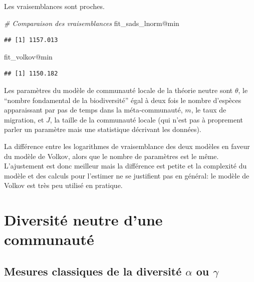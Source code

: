 \documentclass[
  11pt,
  american,
  a4paper,
  extrafontsizes,onecolumn,openright
  ]{memoir}
\newenvironment{Shaded}{\begin{snugshade}}{\end{snugshade}}
\newcommand{\CommentTok}[1]{\textcolor[rgb]{0.56,0.35,0.01}{\textit{#1}}}
\newcommand{\NormalTok}[1]{#1}
\newcommand{\SpecialCharTok}[1]{\textcolor[rgb]{0.00,0.00,0.00}{#1}}
\begin{document}
\normalsize

Les vraisemblances sont proches.

\scriptsize

\begin{Shaded}
\begin{Highlighting}[]
\CommentTok{\# Comparaison des vraisemblances}
\NormalTok{fit\_sads\_lnorm}\SpecialCharTok{@}\NormalTok{min}
\end{Highlighting}
\end{Shaded}

\begin{verbatim}
## [1] 1157.013
\end{verbatim}

\begin{Shaded}
\begin{Highlighting}[]
\NormalTok{fit\_volkov}\SpecialCharTok{@}\NormalTok{min}
\end{Highlighting}
\end{Shaded}

\begin{verbatim}
## [1] 1150.182
\end{verbatim}

\normalsize

Les paramètres du modèle de communauté locale de la théorie neutre sont \(\theta\), le \enquote{nombre fondamental de la biodiversité} égal à deux fois le nombre d'espèces apparaissant par pas de temps dans la méta-communauté, \(m\), le taux de migration, et \(J\), la taille de la communauté locale (qui n'est pas à proprement parler un paramètre mais une statistique décrivant les données).

La différence entre les logarithmes de vraisemblance des deux modèles en faveur du modèle de Volkov, alors que le nombre de paramètres est le même.
L'ajustement est donc meilleur mais la différence est petite et la complexité du modèle et des calculs pour l'estimer ne se justifient pas en général: le modèle de Volkov est très peu utilisé en pratique.

\hypertarget{part-diversituxe9-neutre-dune-communautuxe9}{%
\part{Diversité neutre d'une communauté}\label{part-diversituxe9-neutre-dune-communautuxe9}}

\hypertarget{chap-MesuresNeutres}{%
\chapter{\texorpdfstring{Mesures classiques de la diversité \(\alpha\) ou \(\gamma\)}{Mesures classiques de la diversité \textbackslash alpha ou \textbackslash gamma}}\label{chap-MesuresNeutres}}
\end{document}
